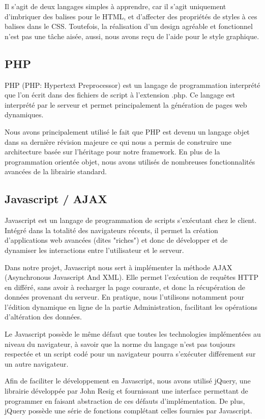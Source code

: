 Il s'agit de deux langages simples à apprendre, car il s'agit uniquement d'imbriquer des
balises pour le HTML, et d'affecter des propriétés de styles à ces balises dans le CSS.
Toutefois, la réalisation d'un design agréable et fonctionnel n'est pas une tâche aisée,
aussi, nous avons reçu de l'aide pour le style graphique.


        \subsection{PHP}
PHP \cite{php} (PHP: Hypertext Preprocessor) est un langage de programmation 
interprété que l'on écrit dans des fichiers de script à l'extension .php. Ce 
langage est interprété par le serveur et permet principalement la génération de 
pages web dynamiques.

Nous avons principalement utilisé le fait que PHP est devenu un langage objet dans 
sa dernière révision majeure ce qui nous a permis de construire une architecture
basée sur l'héritage pour notre framework. En plus de la programmation orientée
objet, nous avons utilisés de nombreuses fonctionnalités avancées de la librairie 
standard.


        \subsection{Javascript / AJAX}
Javascript est un langage de programmation de scripts s'exécutant chez le client.
Intégré dans la totalité des navigateurs récents, il permet la création d'applications 
web avancées (dites "riches") et donc de développer et de dynamiser les interactions
entre l'utilisateur et le serveur.

Dans notre projet, Javascript nous sert à implémenter la méthode AJAX (Asynchronous 
Javascript And XML). Elle permet l'exécution de requêtes HTTP en différé, sans 
avoir à recharger la page courante, et donc la récupération de données provenant du 
serveur. En pratique, nous l'utilisons notamment pour l'édition dynamique en ligne 
de la partie Administration, facilitant les opérations d'altération des données.

Le Javascript possède le même défaut que toutes les technologies implémentées au
niveau du navigateur, à savoir que la norme du langage n'est pas toujours respectée 
et un script codé pour un navigateur pourra s'exécuter différement sur un autre
navigateur.

Afin de faciliter le développement en Javascript, nous avons utilisé jQuery, une 
librairie développée par John Resig et fournissant une interface permettant de 
programmer en faisant abstraction de ces défauts d'implémentation. De plus, jQuery 
possède une série de fonctions complétant celles fournies par Javascript.


